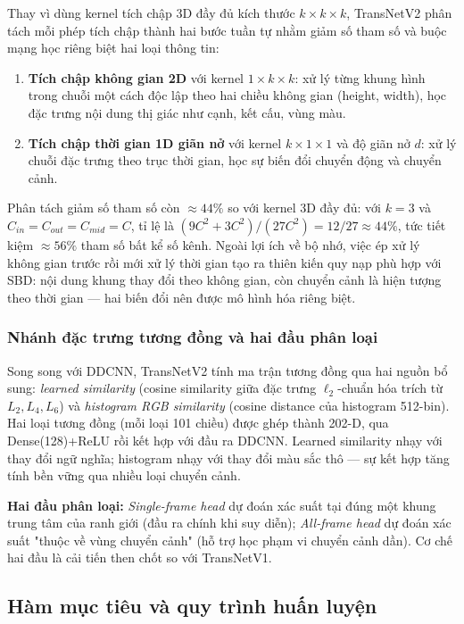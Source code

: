 Thay vì dùng kernel tích chập 3D đầy đủ kích thước $k \times k \times k$, TransNetV2 phân tách mỗi phép tích chập thành hai bước tuần tự nhằm giảm số tham số và buộc mạng học riêng biệt hai loại thông tin:
\begin{enumerate}
    \item \textbf{Tích chập không gian 2D} với kernel $1 \times k \times k$: xử lý từng khung hình trong chuỗi một cách độc lập theo hai chiều không gian (height, width), học đặc trưng nội dung thị giác như cạnh, kết cấu, vùng màu.
    \item \textbf{Tích chập thời gian 1D giãn nở} với kernel $k \times 1 \times 1$ và độ giãn nở $d$: xử lý chuỗi đặc trưng theo trục thời gian, học sự biến đổi chuyển động và chuyển cảnh.
\end{enumerate}

Phân tách giảm số tham số còn $\approx 44\%$ so với kernel 3D đầy đủ: với $k=3$ và $C_{in}=C_{out}=C_{mid}=C$, tỉ lệ là $(9C^2+3C^2)/(27C^2)=12/27\approx44\%$, tức tiết kiệm $\approx56\%$ tham số bất kể số kênh. Ngoài lợi ích về bộ nhớ, việc ép xử lý không gian trước rồi mới xử lý thời gian tạo ra thiên kiến quy nạp phù hợp với SBD: nội dung khung thay đổi theo không gian, còn chuyển cảnh là hiện tượng theo thời gian — hai biến đổi nên được mô hình hóa riêng biệt.

\subsubsection{Nhánh đặc trưng tương đồng và hai đầu phân loại}
\label{subsubsec:similarity_branch}

Song song với DDCNN, TransNetV2 tính ma trận tương đồng qua hai nguồn bổ sung: \textit{learned similarity} (cosine similarity giữa đặc trưng $\ell_2$-chuẩn hóa trích từ $L_2,L_4,L_6$) và \textit{histogram RGB similarity} (cosine distance của histogram 512-bin). Hai loại tương đồng (mỗi loại 101 chiều) được ghép thành 202-D, qua Dense(128)+ReLU rồi kết hợp với đầu ra DDCNN. Learned similarity nhạy với thay đổi ngữ nghĩa; histogram nhạy với thay đổi màu sắc thô — sự kết hợp tăng tính bền vững qua nhiều loại chuyển cảnh.

\textbf{Hai đầu phân loại:} \textit{Single-frame head} dự đoán xác suất tại đúng một khung trung tâm của ranh giới (đầu ra chính khi suy diễn); \textit{All-frame head} dự đoán xác suất "thuộc về vùng chuyển cảnh" (hỗ trợ học phạm vi chuyển cảnh dần). Cơ chế hai đầu là cải tiến then chốt so với TransNetV1.

\subsection{Hàm mục tiêu và quy trình huấn luyện}
\label{subsec:transnetv2_training}

